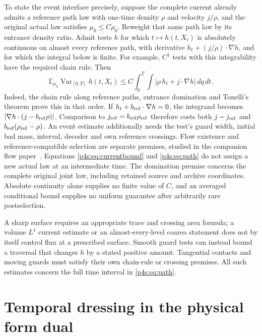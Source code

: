 \documentclass[11pt]{article}
\numberwithin{equation}{section}
\theoremstyle{definition}
\theoremstyle{remark}
\begin{document}
To state the event interface precisely, suppose the complete current
already admits a reference path law with one-time density $\rho$ and
velocity $j/\rho$, and the original actual law satisfies
$\mu_0\leq C\rho_0$. Reweight that same path law by its entrance density
ratio. Admit tests $h$ for which $t\mapsto h(t,X_t)$ is absolutely
continuous on almost every reference path, with derivative
$h_t+(j/\rho)\cdot\nabla h$, and for which the integral below is finite.
For example, $C^1$ tests with this integrability have the required
chain rule. Then
\begin{equation}\label{p4s:eq:path}
 \mathbb E_{\mu_0}\operatorname{Var}_{[0,T]}h(t,X_t)
 \leq C\int_0^T\!\!\int
          |\rho\,h_t+j\cdot\nabla h|\,dq\,dt .
\end{equation}
Indeed, the chain rule along reference paths, entrance domination and
Tonelli's theorem prove this in that order. If
$h_t+b_{\rm ref}\cdot\nabla h=0$, the integrand becomes
$|\nabla h\cdot(j-b_{\rm ref}\rho)|$. Comparison to
$j_{\rm ref}=b_{\rm ref}\rho_{\rm ref}$ therefore costs both
$j-j_{\rm ref}$ and $b_{\rm ref}(\rho_{\rm ref}-\rho)$.
An event estimate additionally needs the test's guard width, initial bad
mass, interval, decoder and own reference crossings. Flow existence and
reference-compatible selection are separate premises, studied in
the companion flow paper~\cite{RodgersP3}. Equations
\eqref{p4s:eq:currentbound} and \eqref{p4s:eq:path} do not assign a new
actual law at an intermediate time. The domination premise concerns
the complete original joint law, including retained source and archive
coordinates. Absolute continuity alone supplies no finite value of $C$,
and an averaged conditional bound supplies no uniform guarantee after
arbitrarily rare postselection.

A sharp surface requires an appropriate trace and crossing area formula;
a volume $L^1$ current estimate or an almost-every-level coarea statement
does not by itself control flux at a prescribed surface. Smooth guard
tests can instead bound a traversal that changes $h$ by a stated positive
amount. Tangential contacts and moving guards must satisfy their own
chain-rule or crossing premises. All such estimates concern the full
time interval in \eqref{p4s:eq:path}.


\section{Temporal dressing in the physical form dual}
\label{p4f:sec:lift}
\end{document}
